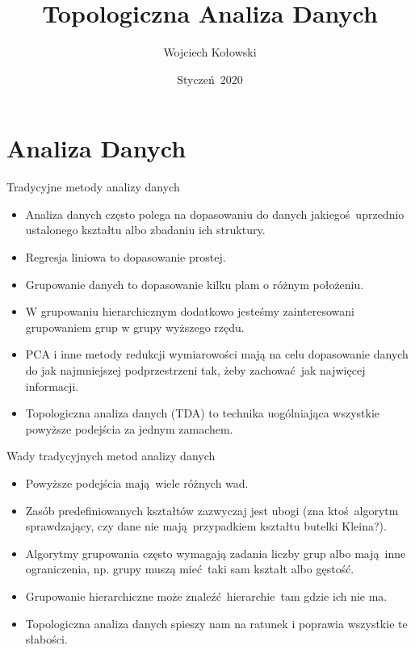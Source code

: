 \documentclass{beamer}
\title{Topologiczna Analiza Danych}
\author{Wojciech Kołowski}
\date{Styczeń 2020}
\begin{document}
\frame{\titlepage}

\frame{\tableofcontents}

\section{Analiza Danych}

\begin{frame}{Tradycyjne metody analizy danych}
\begin{itemize}
	\item Analiza danych często polega na dopasowaniu do danych jakiegoś uprzednio ustalonego kształtu albo zbadaniu ich struktury.
	\item Regresja liniowa to dopasowanie prostej.
	\item Grupowanie danych to dopasowanie kilku plam o różnym położeniu.
	\item W grupowaniu hierarchicznym dodatkowo jesteśmy zainteresowani grupowaniem grup w grupy wyższego rzędu.
	\item PCA i inne metody redukcji wymiarowości mają na celu dopasowanie danych do jak najmniejszej podprzestrzeni tak, żeby zachować jak najwięcej informacji.
	\item Topologiczna analiza danych (TDA) to technika uogólniająca wszystkie powyższe podejścia za jednym zamachem.
\end{itemize}
\end{frame}

\begin{frame}{Wady tradycyjnych metod analizy danych}
\begin{itemize}
	\item Powyższe podejścia mają wiele różnych wad.
	\item Zasób predefiniowanych kształtów zazwyczaj jest ubogi (zna ktoś algorytm sprawdzający, czy dane nie mają przypadkiem kształtu butelki Kleina?).
	\item Algorytmy grupowania często wymagają zadania liczby grup albo mają inne ograniczenia, np. grupy muszą mieć taki sam kształt albo gęstość.
	\item Grupowanie hierarchiczne może znaleźć hierarchie tam gdzie ich nie ma.
	\item Topologiczna analiza danych spieszy nam na ratunek i poprawia wszystkie te słabości.
\end{itemize}
\end{frame}
\end{document}
